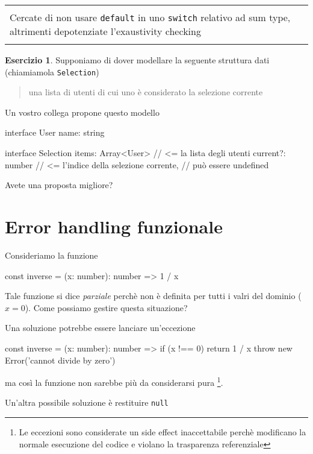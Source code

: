 \documentclass[12pt]{article}
\theoremstyle{definition}
\newtheorem{exercise}{Esercizio}[subsection]
\newenvironment{boxed}
    {\begin{center}
    \begin{tabular}{|p{0.9\textwidth}|}
    \hline\\
    }
    {
    \\\\\hline
    \end{tabular}
    \end{center}
    }
\newenvironment{code}
  {\vspace{0.5cm} \VerbatimEnvironment\begin{typescriptcode}}
  {\end{typescriptcode} \vspace{0.2cm}}
\begin{document}
\begin{boxed}
Cercate di non usare \texttt{default} in uno \texttt{switch} relativo ad sum type, altrimenti depotenziate l'exaustivity checking
\end{boxed}

\begin{exercise}
Supponiamo di dover modellare la seguente struttura dati (chiamiamola \texttt{Selection})

\begin{quote}
una lista di utenti di cui uno è considerato la selezione corrente
\end{quote}

Un vostro collega propone questo modello

\begin{code}
interface User {
  name: string
}

interface Selection {
  items: Array<User> // <= la lista degli utenti
  current?: number   // <= l'indice della selezione corrente,
                     // può essere undefined
}
\end{code}

Avete una proposta migliore?
\end{exercise}

\newpage
\section{Error handling funzionale}

Consideriamo la funzione

\begin{code}
const inverse = (x: number): number => 1 / x
\end{code}

Tale funzione si dice \emph{parziale} perchè non è definita per tutti i valri del dominio ($x = 0$).
Come possiamo gestire questa situazione?

Una soluzione potrebbe essere lanciare un'eccezione

\begin{code}
const inverse = (x: number): number => {
  if (x !== 0) return 1 / x
  throw new Error('cannot divide by zero')
}
\end{code}

ma così la funzione non sarebbe più da considerarsi pura
\footnote{Le eccezioni sono considerate un side effect inaccettabile perchè modificano la normale esecuzione del codice
e violano la trasparenza referenziale}.

Un'altra possibile soluzione è restituire \texttt{null}
\end{document}
